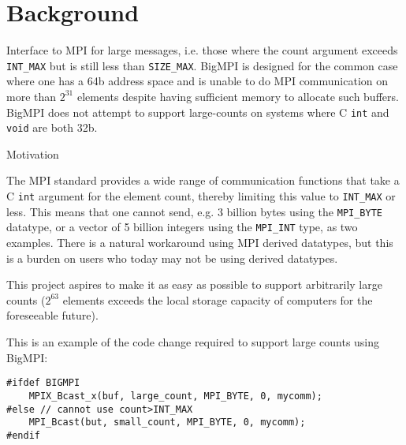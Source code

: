 
\section{Background}

Interface to MPI for large messages, i.e. those where the count argument
exceeds \texttt{INT\_MAX} but is still less than \texttt{SIZE\_MAX}.
BigMPI is designed for the common case where one has a 64b address
space and is unable to do MPI communication on more than $2^{31}$ elements
despite having sufficient memory to allocate such buffers.
BigMPI does not attempt to support large-counts on systems where
C \texttt{int} and \texttt{void\*} are both 32b.

Motivation

The MPI standard provides a wide range of communication functions that
take a C \texttt{int} argument for the element count, thereby limiting this
value to \texttt{INT\_MAX} or less.
This means that one cannot send, e.g. 3 billion bytes using the \texttt{MPI\_BYTE} 
datatype, or a vector of 5 billion integers using the \texttt{MPI\_INT} type, as
two examples.
There is a natural workaround using MPI derived datatypes, but this is
a burden on users who today may not be using derived datatypes.

This project aspires to make it as easy as possible to support arbitrarily
large counts ($2^{63}$ elements exceeds the local storage capacity of computers
for the foreseeable future).

This is an example of the code change required to support large counts using
BigMPI:
\begin{verbatim}
#ifdef BIGMPI
    MPIX_Bcast_x(buf, large_count, MPI_BYTE, 0, mycomm);
#else // cannot use count>INT_MAX
    MPI_Bcast(but, small_count, MPI_BYTE, 0, mycomm);
#endif
\end{verbatim}
